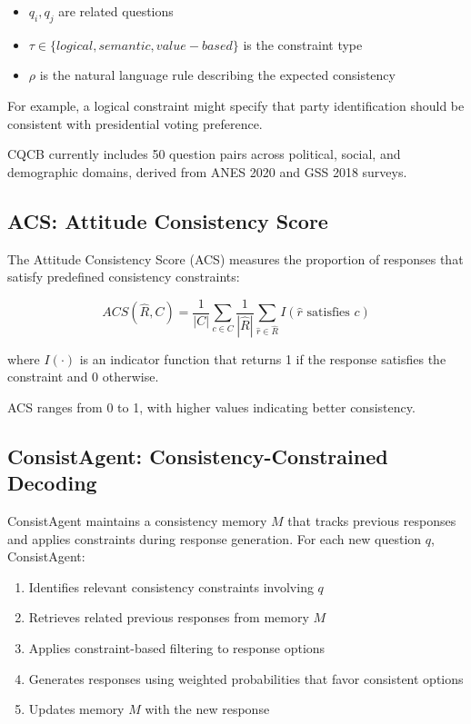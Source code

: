 \documentclass{article}
\begin{document}
\begin{itemize}
    \item $q_i, q_j$ are related questions
    \item $\tau \in \{logical, semantic, value-based\}$ is the constraint type
    \item $\rho$ is the natural language rule describing the expected consistency
\end{itemize}

For example, a logical constraint might specify that party identification should be consistent with presidential voting preference.

CQCB currently includes 50 question pairs across political, social, and demographic domains, derived from ANES 2020 and GSS 2018 surveys.

\subsection{ACS: Attitude Consistency Score}

The Attitude Consistency Score (ACS) measures the proportion of responses that satisfy predefined consistency constraints:

\[
ACS(\hat{R}, C) = \frac{1}{|C|} \sum_{c \in C} \frac{1}{|\hat{R}|} \sum_{\hat{r} \in \hat{R}} I(\hat{r} \text{ satisfies } c)
\]

where $I(\cdot)$ is an indicator function that returns 1 if the response satisfies the constraint and 0 otherwise.

ACS ranges from 0 to 1, with higher values indicating better consistency.

\subsection{ConsistAgent: Consistency-Constrained Decoding}

ConsistAgent maintains a consistency memory $M$ that tracks previous responses and applies constraints during response generation. For each new question $q$, ConsistAgent:

\begin{enumerate}
    \item Identifies relevant consistency constraints involving $q$
    \item Retrieves related previous responses from memory $M$
    \item Applies constraint-based filtering to response options
    \item Generates responses using weighted probabilities that favor consistent options
    \item Updates memory $M$ with the new response
\end{enumerate}
\end{document}
